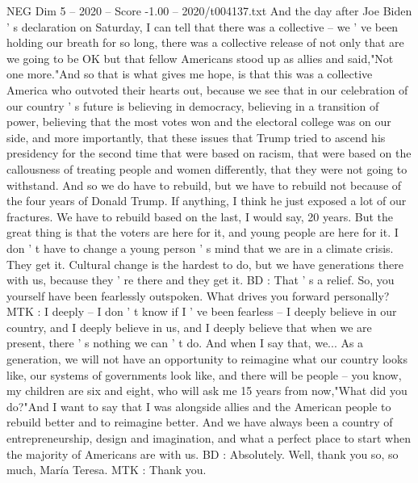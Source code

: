 \begin{textsample}{NEG Dim 5 – 2020 – Score -1.00 – 2020/t004137.txt}
And the day after Joe Biden ' s declaration on Saturday, I can tell that there was a collective -- we ' ve been holding our breath for so long, there was a collective release of not only that are we going to be OK but that fellow Americans stood up as allies and said,"Not one more."And so that is what gives me hope, is that this was a collective America who outvoted their hearts out, because we see that in our celebration of our country ' s future is believing in democracy, believing in a transition of power, believing that the most votes won and the electoral college was on our side, and more importantly, that these issues that Trump tried to ascend his presidency for the second time that were based on racism, that were based on the callousness of treating people and women differently, that they were not going to withstand.
And so we do have to rebuild, but we have to rebuild not because of the four years of Donald Trump.
If anything, I think he just exposed a lot of our fractures.
We have to rebuild based on the last, I would say, 20 years.
But the great thing is that the voters are here for it, and young people are here for it.
I don ' t have to change a young person ' s mind that we are in a climate crisis.
They get it.
Cultural change is the hardest to do, but we have generations there with us, because they ' re there and they get it.
BD : That ' s a relief.
So, you yourself have been fearlessly outspoken.
What drives you forward personally?
MTK : I deeply -- I don ' t know if I ' ve been fearless -- I deeply believe in our country, and I deeply believe in us, and I deeply believe that when we are present, there ' s nothing we can ' t do.
And when I say that, we...
As a generation, we will not have an opportunity to reimagine what our country looks like, our systems of governments look like, and there will be people -- you know, my children are six and eight, who will ask me 15 years from now,"What did you do?"And I want to say that I was alongside allies and the American people to rebuild better and to reimagine better.
And we have always been a country of entrepreneurship, design and imagination, and what a perfect place to start when the majority of Americans are with us.
BD : Absolutely.
Well, thank you so, so much, María Teresa.
MTK : Thank you.

\end{textsample}
